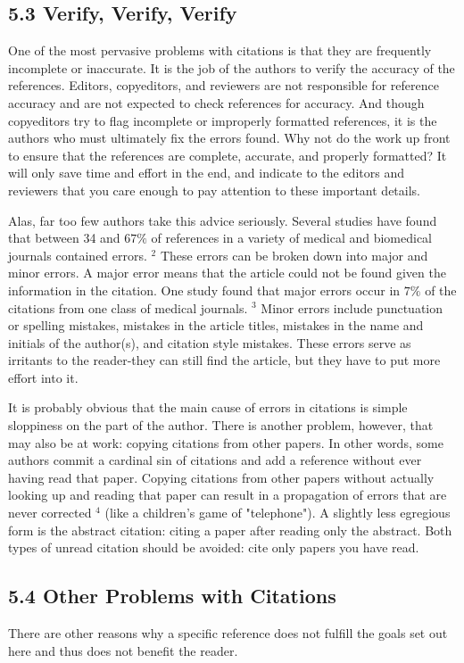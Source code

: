 \subsection*{5.3 Verify, Verify, Verify}
One of the most pervasive problems with citations is that they are frequently incomplete or inaccurate. It is the job of the authors to verify the accuracy of the references. Editors, copyeditors, and reviewers are not responsible for reference accuracy and are not expected to check references for accuracy. And though copyeditors try to flag incomplete or improperly formatted references, it is the authors who must ultimately fix the errors found. Why not do the work up front to ensure that the references are complete, accurate, and properly formatted? It will only save time and effort in the end, and indicate to the editors and reviewers that you care enough to pay attention to these important details.

Alas, far too few authors take this advice seriously. Several studies have found that between 34 and $67 \%$ of references in a variety of medical and biomedical journals contained errors. ${ }^{2}$ These errors can be broken down into major and minor errors. A major error means that the article could not be found given the information in the citation. One study found that major errors occur in $7 \%$ of the citations from one class of medical journals. ${ }^{3}$ Minor errors include punctuation or spelling mistakes, mistakes in the article titles, mistakes in the name and initials of the author(s), and citation style mistakes. These errors serve as irritants to the reader-they can still find the article, but they have to put more effort into it.

It is probably obvious that the main cause of errors in citations is simple sloppiness on the part of the author. There is another problem, however, that may also be at work: copying citations from other papers. In other words, some authors commit a cardinal sin of citations and add a reference without ever having read that paper. Copying citations from other papers without actually looking up and reading that paper can result in a propagation of errors that are never corrected ${ }^{4}$ (like a children's game of "telephone"). A slightly less egregious form is the abstract citation: citing a paper after reading only the abstract. Both types of unread citation should be avoided: cite only papers you have read.

\subsection*{5.4 Other Problems with Citations}
There are other reasons why a specific reference does not fulfill the goals set out here and thus does not benefit the reader.

